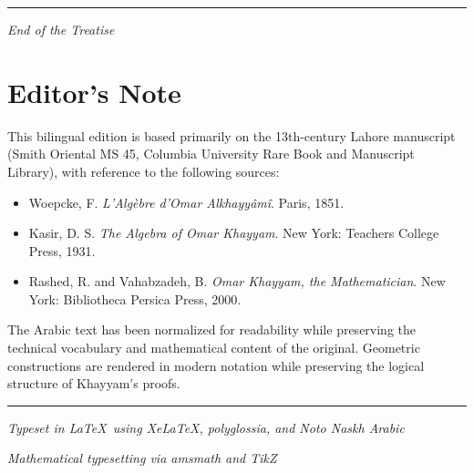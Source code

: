 \documentclass[11pt,a4paper]{book}
\begin{document}
\vspace{1cm}

\begin{center}
{\color{rulecolor}\rule{0.6\textwidth}{0.8pt}}

{\small\textit{End of the Treatise}}
\end{center}

\clearpage
\section*{Editor's Note}

This bilingual edition is based primarily on the 13th-century Lahore manuscript (Smith Oriental MS 45, Columbia University Rare Book and Manuscript Library), with reference to the following sources:

\begin{itemize}[noitemsep]
\item Woepcke, F. \textit{L'Algèbre d'Omar Alkhayyâmî}. Paris, 1851.
\item Kasir, D. S. \textit{The Algebra of Omar Khayyam}. New York: Teachers College Press, 1931.
\item Rashed, R. and Vahabzadeh, B. \textit{Omar Khayyam, the Mathematician}. New York: Bibliotheca Persica Press, 2000.
\end{itemize}

The Arabic text has been normalized for readability while preserving the technical vocabulary and mathematical content of the original. Geometric constructions are rendered in modern notation while preserving the logical structure of Khayyam's proofs.

\vspace{1cm}

\begin{center}
{\color{rulecolor}\rule{0.4\textwidth}{0.4pt}}

{\footnotesize\textit{Typeset in \LaTeX\ using XeLaTeX, polyglossia, and Noto Naskh Arabic}}

{\footnotesize\textit{Mathematical typesetting via amsmath and TikZ}}
\end{center}
\end{document}
